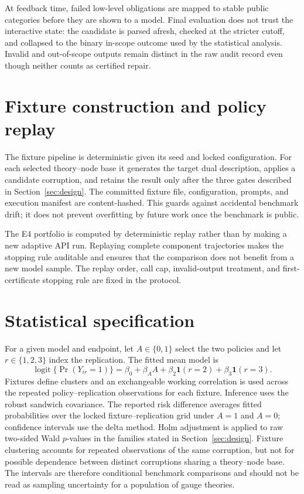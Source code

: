 \documentclass[11pt]{scrartcl}
\begin{document}
At feedback time, failed low-level obligations are mapped to stable public
categories before they are shown to a model.  Final evaluation does not trust
the interactive state: the candidate is parsed afresh, checked at the stricter
cutoff, and collapsed to the binary in-scope outcome used by the statistical
analysis.  Invalid and out-of-scope outputs remain distinct in the raw audit
record even though neither counts as certified repair.

\section{Fixture construction and policy replay}
\label{app:fixtures}

The fixture pipeline is deterministic given its seed and locked configuration.
For each selected theory--node base it generates the target dual description,
applies a candidate corruption, and retains the result only after the three
gates described in Section~\ref{sec:design}.  The committed fixture file,
configuration, prompts, and execution manifest are content-hashed.  This guards
against accidental benchmark drift; it does not prevent overfitting by future
work once the benchmark is public.

The E4 portfolio is computed by deterministic replay rather than by making a
new adaptive API run.  Replaying complete component trajectories makes the
stopping rule auditable and ensures that the comparison does not benefit from a
new model sample.  The replay order, call cap, invalid-output treatment, and
first-certificate stopping rule are fixed in the protocol.

\section{Statistical specification}
\label{app:statistics}

For a given model and endpoint, let $A\in\{0,1\}$ select the two policies and
let $r\in\{1,2,3\}$ index the replication.  The fitted mean model is
\begin{equation}
  \operatorname{logit}\{\Pr(Y_{ir}=1)\}
  =\beta_0+\beta_A A+\beta_2\mathbf 1(r=2)+\beta_3\mathbf 1(r=3).
\end{equation}
Fixtures define clusters and an exchangeable working correlation is used across
the repeated policy--replication observations for each fixture.  Inference uses
the robust sandwich covariance.  The reported risk difference averages fitted
probabilities over the locked fixture--replication grid under $A=1$ and $A=0$;
confidence intervals use the delta method.  Holm adjustment is applied to raw
two-sided Wald $p$-values in the families stated in Section~\ref{sec:design}.
Fixture clustering accounts for repeated observations of the same corruption,
but not for possible dependence between distinct corruptions sharing a
theory--node base.  The intervals are therefore conditional benchmark
comparisons and should not be read as sampling uncertainty for a population of
gauge theories.
\end{document}
